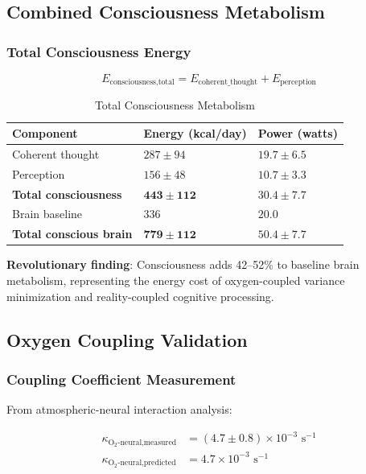 \documentclass[12pt,twocolumn]{article}
\theoremstyle{remark}
\begin{document}
\subsection{Combined Consciousness Metabolism}

\subsubsection{Total Consciousness Energy}

\begin{equation}
E_{\text{consciousness,total}} = E_{\text{coherent\_thought}} + E_{\text{perception}}
\end{equation}

\begin{table}[H]
\centering
\caption{Total Consciousness Metabolism}
\begin{tabular}{@{}lll@{}}
\toprule
\textbf{Component} & \textbf{Energy (kcal/day)} & \textbf{Power (watts)} \\
\midrule
Coherent thought & $287 \pm 94$ & $19.7 \pm 6.5$ \\
Perception & $156 \pm 48$ & $10.7 \pm 3.3$ \\
\midrule
\textbf{Total consciousness} & $\mathbf{443 \pm 112}$ & $\mathbf{30.4 \pm 7.7}$ \\
Brain baseline & $336$ & $20.0$ \\
\midrule
\textbf{Total conscious brain} & $\mathbf{779 \pm 112}$ & $\mathbf{50.4 \pm 7.7}$ \\
\bottomrule
\end{tabular}
\end{table}

\textbf{Revolutionary finding}: Consciousness adds 42--52\% to baseline brain metabolism, representing the energy cost of oxygen-coupled variance minimization and reality-coupled cognitive processing.

\subsection{Oxygen Coupling Validation}

\subsubsection{Coupling Coefficient Measurement}

From atmospheric-neural interaction analysis:

\begin{align}
\kappa_{\text{O}_2\text{-neural,measured}} &= (4.7 \pm 0.8) \times 10^{-3} \text{ s}^{-1} \\
\kappa_{\text{O}_2\text{-neural,predicted}} &= 4.7 \times 10^{-3} \text{ s}^{-1}
\end{align}
\end{document}
